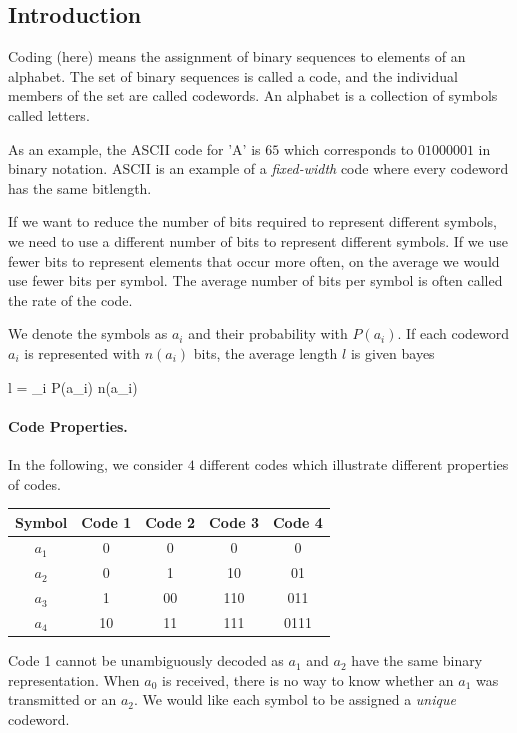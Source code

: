 
\subsection{Introduction}

Coding (here) means the assignment of binary sequences to elements of an alphabet. The set of binary sequences is called a code, and the individual members of the set are called codewords. An alphabet is a collection of symbols called letters.

As an example, the ASCII code for 'A' is $65$ which corresponds to $01000001$ in binary notation. ASCII is an example of a \emph{fixed-width} code where every codeword has the same bitlength.

If we want to reduce the number of bits required to represent different symbols, we need to use a different number of bits to represent different symbols. If we use fewer bits to represent elements that occur more often, on the average we would use fewer bits per symbol. The average number of bits per symbol is often called the rate of the code.

We denote the symbols as $a_i$ and their probability with $P(a_i)$. If each codeword $a_i$ is represented with $n(a_i)$ bits, the average length $l$ is given bayes

\bee
l = \sum_i P(a_i) n(a_i)
\eee

\paragraph{Code Properties.} In the following, we consider $4$ different codes which illustrate different properties of codes.

\vspace{3mm}

\begin{tabular}{c|cccc}
    \label{2021-04-14_tab1}
    Symbol & Code 1 & Code 2 & Code 3 & Code 4 \\ \hline
    $a_1$ & 0 & 0 & 0 & 0  \\
    $a_2$ & 0 & 1 & 10 & 01  \\
    $a_3$ & 1 & 00 & 110 & 011  \\
    $a_4$ & 10 & 11 & 111 & 0111
\end{tabular}

\vspace{3mm}

Code 1 cannot be unambiguously decoded as $a_1$ and $a_2$ have the same binary representation. When $a_0$ is received, there is no way to know whether an $a_1$ was transmitted or an $a_2$. We would like each symbol to be assigned a \emph{unique} codeword.

